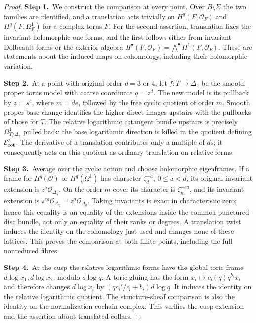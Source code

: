 \begin{proof}
\par\smallskip\noindent\textbf{Step 1.}\ We construct the comparison at every point. Over $B\setminus\Sigma$
the two families are identified, and a translation acts trivially on
$H^q(F,\mathcal O_F)$ and $H^q(F,\Omega^1_F)$ for a complex torus $F$.
For the second assertion, translation fixes the invariant holomorphic
one-forms, and the first follows either from invariant Dolbeault forms
or the exterior algebra $H^\bullet(F,\mathcal O_F)=\bigwedge^\bullet H^1(F,\mathcal O_F)$.
These are statements about the induced maps on cohomology, including
their holomorphic variation.

\par\smallskip\noindent\textbf{Step 2.}\ At a point with original order $d=3$ or $4$, let
$\widetilde f:T\to\Delta_z$ be the smooth proper torus model with
coarse coordinate $q=z^d$. The new model is its pullback by $z=s^e$,
where $m=de$, followed by the free cyclic quotient of order $m$.
Smooth proper base change identifies the higher direct images upstairs
with the pullbacks of those for $T$. The relative logarithmic cotangent
bundle upstairs is precisely $\Omega^1_{T/\Delta_z}$ pulled back:
the base logarithmic direction is killed in the quotient defining $\mathcal E_{\rm cot}'$.
The derivative of a translation contributes only a multiple of $ds$;
it consequently acts on this quotient as ordinary translation on relative forms.

\par\smallskip\noindent\textbf{Step 3.}\ Average over the cyclic action and choose holomorphic eigenframes.
If a frame for $H^q(\mathcal O)$ or $H^q(\Omega^1)$ has character
$\zeta_d^{-a}$, $0\le a<d$, its original invariant extension is
$z^a\mathcal O_{\Delta_q}$. On the order-$m$ cover its character is
$\zeta_m^{-ea}$, and its invariant extension is
$s^{ea}\mathcal O_{\Delta_q}=z^a\mathcal O_{\Delta_q}$.
Taking invariants is exact in characteristic zero; hence this equality
is an equality of the extensions inside the common punctured-disc
bundle, not only an equality of their ranks or degrees. A translation
twist induces the identity on the cohomology just used and changes none
of these lattices. This proves the comparison at both finite points,
including the full nonreduced fibres.

\par\smallskip\noindent\textbf{Step 4.}\ At the cusp the relative logarithmic forms have the global toric frame
$d\log x_1,d\log x_2$, modulo $d\log q$.
A toric gluing has the form
$x_i\mapsto c_i(q)q^{b_i}x_i$ and therefore changes $d\log x_i$ by
$(q c_i'/c_i+b_i)d\log q$. It induces the identity on the relative
logarithmic quotient. The structure-sheaf comparison is also the identity
on the normalization cochain complex. This verifies the cusp extension
and the assertion about translated collars.


\end{proof}
